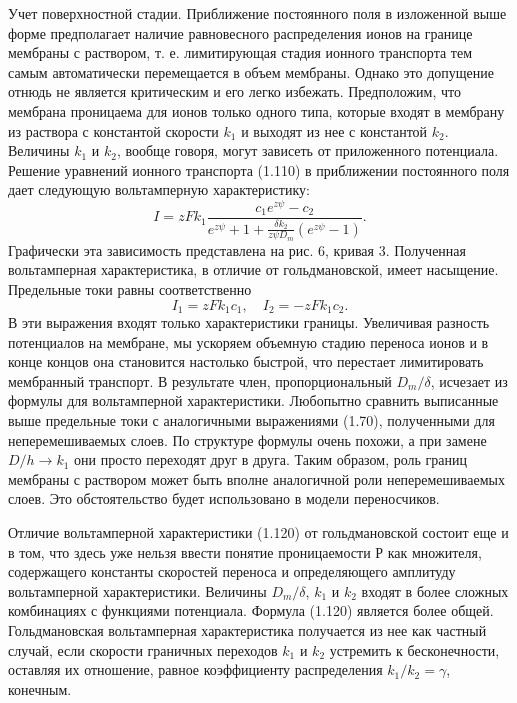 Учет поверхностной стадии. Приближение постоянного поля в изложенной выше форме
предполагает наличие равновесного распределения ионов на границе мембраны с
раствором, т. е. лимитирующая стадия ионного транспорта тем самым автоматически
перемещается в объем мембраны. Однако это допущение отнюдь не является
критическим и его легко избежать. Предположим, что мембрана проницаема для ионов
только одного типа, которые входят в мембрану из раствора с константой скорости
\(k_1\) и выходят из нее с константой \(k_2\). Величины \(k_1\) и \(k_2\),
вообще говоря, могут зависеть от приложенного потенциала. Решение уравнений
ионного транспорта (1.110) в приближении постоянного поля дает следующую
вольтамперную характеристику:
\begin{equation}
    I = zFk_1\frac{c_1e^{z\psi}-c_2}
        {e^{z\psi}+1+\frac{\delta k_2}{z\psi D_m}(e^{z\psi}-1)}.
\end{equation}
Графически эта зависимость представлена на рис. 6, кривая 3. Полученная
вольтамперная характеристика, в отличие от гольдмановской, имеет насыщение.
Предельные токи равны соответственно
\begin{equation}
    I_1 = zFk_1c_1, \quad I_2 = -zFk_1c_2.
\end{equation}
В эти выражения входят только характеристики границы. Увеличивая разность
потенциалов на мембране, мы ускоряем объемную стадию переноса ионов и в конце
концов она становится настолько быстрой, что перестает лимитировать мембранный
транспорт. В результате член, пропорциональный \( D_m / \delta \), исчезает из
формулы для вольтамперной характеристики. Любопытно сравнить выписанные выше
предельные токи с аналогичными выражениями (1.70), полученными для
неперемешиваемых слоев. По структуре формулы очень похожи, а при замене
\( D/h \to k_1 \) они просто переходят друг в друга. Таким образом, роль границ
мембраны с раствором может быть вполне аналогичной роли неперемешиваемых слоев.
Это обстоятельство будет использовано в модели переносчиков.

Отличие вольтамперной характеристики (1.120) от гольдмановской состоит еще и в
том, что здесь уже нельзя ввести понятие проницаемости Р как множителя,
содержащего константы скоростей переноса и определяющего амплитуду вольтамперной
характеристики. Величины \( D_m/\delta \), \( k_1 \) и \( k_2 \) входят в более
сложных комбинациях с функциями потенциала. Формула (1.120) является более
общей. Гольдмановская вольтамперная характеристика получается из нее как частный
случай, если скорости граничных переходов \( k_1 \) и \( k_2 \) устремить к
бесконечности, оставляя их отношение, равное коэффициенту распределения
\( k_1/k_2= \gamma \), конечным.

